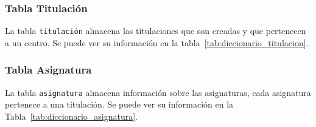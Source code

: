 \subsubsection{Tabla Titulación}
La tabla \texttt{titulación} almacena las titulaciones que son creadas y que pertenecen a un centro.
Se puede ver su información en la tabla~\ref{tab:diccionario_titulacion}.
\begin{table}[h]
  \caption{Diccionario de datos. Tabla Titulación}
  \label{tab:diccionario_titulacion}
\end{table}

\subsubsection{Tabla Asignatura}
La tabla \texttt{asignatura} almacena información sobre las asignaturas, cada asignatura pertenece a una titulación. Se puede ver su información en la Tabla~\ref{tab:diccionario_asignatura}.

